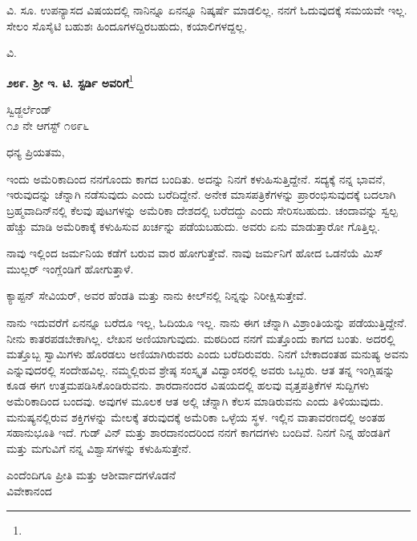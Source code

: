 ವಿ. ಸೂ.\enginline{-} ಉಪನ್ಯಾಸದ ವಿಷಯದಲ್ಲಿ ನಾನಿನ್ನೂ ಏನನ್ನೂ ನಿಷ್ಕರ್ಷೆ ಮಾಡಲಿಲ್ಲ. ನನಗೆ ಓದುವುದಕ್ಕೆ ಸಮಯವೇ ಇಲ್ಲ. ಸೇಲಂ ಸೊಸೈಟಿ ಬಹುಶಃ ಹಿಂದೂಗಳದ್ದಿರಬಹುದು, ಕಯಾಲಿಗಳದ್ದಲ್ಲ.

{\flushright
ವಿ.\par}

\begin{center}
\textbf{೨೮೯. ಶ‍್ರೀ ಇ. ಟಿ. ಸ್ಟರ್ಡಿ ಅವರಿಗೆ}\footnote{}
\end{center}

\begin{flushright}
ಸ್ವಿಡ್ಜರ್ಲೆಂಡ್\\೧೨ ನೇ ಆಗಸ್ಟ್ ೧೮೯೬
\end{flushright}

\noindent
ಧನ್ಯ ಪ್ರಿಯತಮ,

ಇಂದು ಅಮೆರಿಕಾದಿಂದ ನನಗೊಂದು ಕಾಗದ ಬಂದಿತು. ಅದನ್ನು ನಿನಗೆ ಕಳುಹಿಸು\break ತ್ತಿದ್ದೇನೆ. ಸದ್ಯಕ್ಕೆ ನನ್ನ ಭಾವನೆ, ಇರುವುದನ್ನು ಚೆನ್ನಾಗಿ ನಡೆಸುವುದು ಎಂದು ಬರೆದಿದ್ದೇನೆ. ಅನೇಕ ಮಾಸಪತ್ರಿಕೆಗಳನ್ನು ಪ್ರಾರಂಭಿಸುವುದಕ್ಕೆ ಬದಲಾಗಿ ಬ್ರಹ್ಮವಾದಿನ್‌ನಲ್ಲಿ ಕೆಲವು ಪುಟಗಳನ್ನು\enginline{-} ಅಮೆರಿಕಾ ದೇಶದಲ್ಲಿ ಬರೆದದ್ದು\enginline{-} ಎಂದು ಸೇರಿಸಬಹುದು. ಚಂದಾವನ್ನು ಸ್ವಲ್ಪ ಹೆಚ್ಚು ಮಾಡಿ ಅಮೆರಿಕಾಕ್ಕೆ ಕಳುಹಿಸುವ ಖರ್ಚನ್ನು ಪಡೆಯಬಹುದು. ಅವರು ಏನು ಮಾಡುತ್ತಾರೋ ಗೊತ್ತಿಲ್ಲ.

ನಾವು ಇಲ್ಲಿಂದ ಜರ್ಮನಿಯ ಕಡೆಗೆ ಬರುವ ವಾರ ಹೋಗುತ್ತೇವೆ. ನಾವು ಜರ್ಮನಿಗೆ ಹೋದ ಒಡನೆಯೆ ಮಿಸ್ ಮುಲ್ಲರ್ ಇಂಗ್ಲೆಂಡಿಗೆ ಹೋಗುತ್ತಾಳೆ.

ಕ್ಯಾಪ್ಟನ್ ಸೇವಿಯರ್, ಅವರ ಹೆಂಡತಿ ಮತ್ತು ನಾನು ಕೀಲ್‌ನಲ್ಲಿ ನಿನ್ನನ್ನು ನಿರೀಕ್ಷಿಸುತ್ತೇವೆ.


ನಾನು ಇದುವರೆಗೆ ಏನನ್ನೂ ಬರೆದೂ ಇಲ್ಲ, ಓದಿಯೂ ಇಲ್ಲ. ನಾನು ಈಗ ಚೆನ್ನಾಗಿ ವಿಶ್ರಾಂತಿಯನ್ನು ಪಡೆಯುತ್ತಿದ್ದೇನೆ. ನೀನು ಕಾತರಪಡಬೇಕಾಗಿಲ್ಲ. ಲೇಖನ ಅಣಿಯಾಗುವುದು. ಮಠದಿಂದ ನನಗೆ ಮತ್ತೊಂದು ಕಾಗದ ಬಂತು. ಅದರಲ್ಲಿ ಮತ್ತೊಬ್ಬ ಸ್ವಾಮಿಗಳು ಹೊರಡಲು ಅಣಿಯಾಗಿರುವರು ಎಂದು ಬರೆದಿರುವರು. ನಿನಗೆ ಬೇಕಾದಂತಹ ಮನುಷ್ಯ ಅವನು ಎನ್ನುವುದರಲ್ಲಿ ಸಂದೇಹವಿಲ್ಲ. ನಮ್ಮಲ್ಲಿರುವ ಶ್ರೇಷ್ಠ ಸಂಸ್ಕೃತ ವಿದ್ವಾಂಸರಲ್ಲಿ ಅವರು ಒಬ್ಬರು. ಆತ ತನ್ನ ಇಂಗ್ಲಿಷನ್ನು ಕೂಡ ಈಗ ಉತ್ತಮಪಡಿಸಿಕೊಂಡಿರುವನು. ಶಾರದಾನಂದರ ವಿಷಯದಲ್ಲಿ ಹಲವು ವೃತ್ತಪತ್ರಿಕೆಗಳ ಸುದ್ದಿಗಳು ಅಮೆರಿಕಾದಿಂದ ಬಂದವು. ಅವುಗಳ ಮೂಲಕ ಆತ ಅಲ್ಲಿ ಚೆನ್ನಾಗಿ ಕೆಲಸ ಮಾಡಿರುವನು ಎಂದು ತಿಳಿಯುವುದು. ಮನುಷ್ಯನಲ್ಲಿರುವ ಶಕ್ತಿಗಳನ್ನು ಮೇಲಕ್ಕೆ ತರುವುದಕ್ಕೆ ಅಮೆರಿಕಾ ಒಳ್ಳೆಯ ಸ್ಥಳ. ಇಲ್ಲಿನ ವಾತಾವರಣದಲ್ಲಿ ಅಂತಹ ಸಹಾನುಭೂತಿ ಇದೆ. ಗುಡ್ ವಿನ್ ಮತ್ತು ಶಾರದಾನಂದರಿಂದ ನನಗೆ ಕಾಗದಗಳು ಬಂದಿವೆ. ನಿನಗೆ ನಿನ್ನ ಹೆಂಡತಿಗೆ ಮತ್ತು ಮಗುವಿಗೆ ನನ್ನ ವಿಶ್ವಾಸಗಳನ್ನು ಕಳುಹಿಸುತ್ತೇನೆ.

\vspace{0.1cm}

\vspace{-0.3cm}

{\flushright
ಎಂದೆಂದಿಗೂ ಪ್ರೀತಿ ಮತ್ತು ಆಶೀರ್ವಾದಗಳೊಡನೆ\\ವಿವೇಕಾನಂದ\par}

